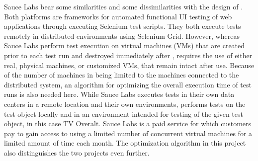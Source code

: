 Sauce Labs bear some similarities and some dissimilarities with the design of \toolname. Both platforms are frameworks for automated functional UI testing of web applications through executing Selenium test scripts. They both execute tests remotely in distributed environments using Selenium Grid. However, whereas Sauce Labs perform test execution on virtual machines (VMs) that are created prior to each test run and destroyed immediately after \cite{SauceLabsFeatures}, \toolname \space requires the use of either real, physical machines, or customized VMs, that remain intact after use. Because of the number of machines in \toolname \space being limited to the machines connected to the distributed system, an algorithm for optimizing the overall execution time of test runs is also needed here. While Sauce Labs executes tests in their own data centers in a remote location and their own environments, \toolname \space performs tests on the test object locally and in an environment intended for testing of the given test object, in this case TV Overalt. Sauce Labs is a paid service for which customers pay to gain access to using a limited number of concurrent virtual machines for a limited amount of time each month. The optimization algorithm in this project also distinguishes the two projects even further.

